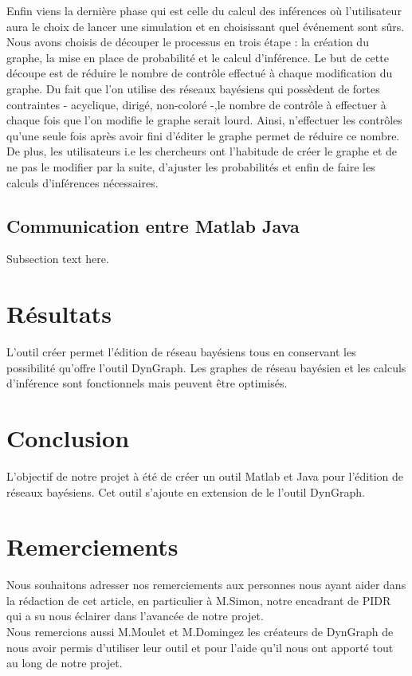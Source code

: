 \documentclass[conference]{IEEEtran}
\begin{document}
Enfin viens la dernière phase qui est celle du calcul des inférences où l'utilisateur aura le choix de lancer une simulation et en choisissant quel événement sont sûrs.\\

Nous avons choisis de découper le processus en trois étape : la création du graphe, la mise en place de probabilité et le calcul d'inférence. Le but de cette découpe est de réduire le nombre de contrôle effectué à chaque modification du graphe. Du fait que l'on utilise des réseaux bayésiens qui possèdent de fortes contraintes - acyclique, dirigé, non-coloré -,le nombre de contrôle à effectuer à chaque fois que l'on modifie le graphe serait lourd. Ainsi, n'effectuer les contrôles qu'une seule fois après avoir fini d'éditer le graphe permet de réduire ce nombre. De plus, les utilisateurs i.e les chercheurs ont l'habitude de créer le graphe et de ne pas le modifier par la suite, d'ajuster les probabilités et enfin de faire les calculs d'inférences nécessaires.

\subsection{Communication entre Matlab Java}
Subsection text here.


\section{Résultats}
	L'outil créer permet l'édition de réseau bayésiens tous en conservant les possibilité qu'offre l'outil DynGraph. Les graphes de réseau bayésien et les calculs d'inférence sont fonctionnels mais peuvent être optimisés. 

\section{Conclusion}

	L'objectif de notre projet à été de créer un outil Matlab et Java pour l'édition de réseaux bayésiens. Cet outil s'ajoute en extension de le l'outil DynGraph.\\
	

\section{Remerciements}
Nous souhaitons adresser nos remerciements aux personnes nous ayant aider dans la rédaction
de cet article, en particulier à M.Simon, notre encadrant de PIDR qui a su nous éclairer dans l'avancée de notre projet. \\
Nous remercions aussi M.Moulet et M.Domingez les créateurs de DynGraph de nous avoir permis d'utiliser leur outil et pour  l'aide qu'il nous ont apporté tout au long de notre projet. 
\end{document}
